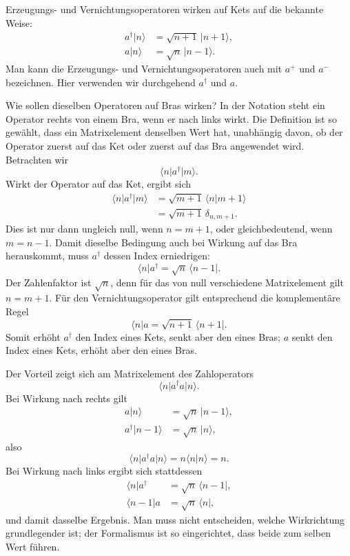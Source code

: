 Erzeugungs- und Vernichtungsoperatoren wirken auf Kets auf die bekannte Weise:
\begin{align}
a^\dagger\lvert n\rangle&=\sqrt{n+1}\,\lvert n+1\rangle,\\
a\lvert n\rangle&=\sqrt n\,\lvert n-1\rangle.
\end{align}
Man kann die Erzeugungs- und Vernichtungsoperatoren auch mit \(a^+\) und \(a^-\) bezeichnen. Hier verwenden wir durchgehend \(a^\dagger\) und \(a\).

Wie sollen dieselben Operatoren auf Bras wirken? In der Notation steht ein Operator rechts von einem Bra, wenn er nach links wirkt. Die Definition ist so gewählt, dass ein Matrixelement denselben Wert hat, unabhängig davon, ob der Operator zuerst auf das Ket oder zuerst auf das Bra angewendet wird. Betrachten wir
\begin{equation}
\langle n\rvert a^\dagger\lvert m\rangle.
\end{equation}
Wirkt der Operator auf das Ket, ergibt sich
\begin{align}
\langle n\rvert a^\dagger\lvert m\rangle
&=\sqrt{m+1}\,\langle n\vert m+1\rangle\\
&=\sqrt{m+1}\,\delta_{n,m+1}.
\end{align}
Dies ist nur dann ungleich null, wenn \(n=m+1\), oder gleichbedeutend, wenn \(m=n-1\). Damit dieselbe Bedingung auch bei Wirkung auf das Bra herauskommt, muss \(a^\dagger\) dessen Index erniedrigen:
\begin{equation}
\langle n\rvert a^\dagger
=\sqrt n\,\langle n-1\rvert.
\end{equation}
Der Zahlenfaktor ist \(\sqrt n\), denn für das von null verschiedene Matrixelement gilt \(n=m+1\). Für den Vernichtungsoperator gilt entsprechend die komplementäre Regel
\begin{equation}
\langle n\rvert a
=\sqrt{n+1}\,\langle n+1\rvert.
\end{equation}
Somit erhöht \(a^\dagger\) den Index eines Kets, senkt aber den eines Bras; \(a\) senkt den Index eines Kets, erhöht aber den eines Bras.

Der Vorteil zeigt sich am Matrixelement des Zahloperators
\begin{equation}
\langle n\rvert a^\dagger a\lvert n\rangle.
\end{equation}
Bei Wirkung nach rechts gilt
\begin{align}
a\lvert n\rangle&=\sqrt n\,\lvert n-1\rangle,\\
a^\dagger\lvert n-1\rangle&=\sqrt n\,\lvert n\rangle,
\end{align}
also
\begin{equation}
\langle n\rvert a^\dagger a\lvert n\rangle
=n\langle n\vert n\rangle=n.
\end{equation}
Bei Wirkung nach links ergibt sich stattdessen
\begin{align}
\langle n\rvert a^\dagger&=\sqrt n\,\langle n-1\rvert,\\
\langle n-1\rvert a&=\sqrt n\,\langle n\rvert,
\end{align}
und damit dasselbe Ergebnis. Man muss nicht entscheiden, welche Wirkrichtung grundlegender ist; der Formalismus ist so eingerichtet, dass beide zum selben Wert führen.

